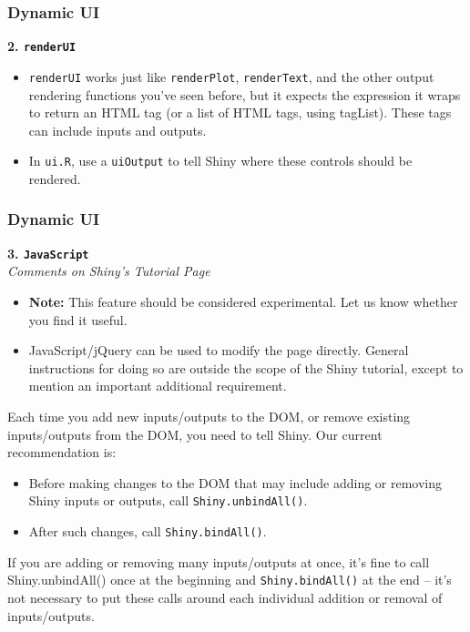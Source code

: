 \documentclass{beamer}
\begin{document}
\begin{frame}
\frametitle{Dynamic UI}
\Large
\textbf{2. \texttt{renderUI}}

\begin{itemize}
\item \texttt{renderUI} works just like \texttt{renderPlot}, \texttt{renderText}, and the other output rendering functions you’ve seen before, but it expects the expression it wraps to return an HTML tag (or a list of HTML tags, using tagList). These tags can include inputs and outputs.

\item In \texttt{ui.R}, use a \texttt{uiOutput} to tell Shiny where these controls should be rendered.
\end{itemize}
\end{frame}
\begin{frame}

\frametitle{Dynamic UI}
\Large
\textbf{3. \texttt{JavaScript}}\\

\textit{Comments on Shiny's Tutorial Page}
\begin{itemize}
\item \textbf{Note:} This feature should be considered experimental. Let us know whether you find it useful.

\item JavaScript/jQuery can be used to modify the page directly. General instructions for doing so are outside the scope of the Shiny tutorial, except to mention an important additional requirement. 
\end{itemize}
\end{frame}
\begin{frame}
Each time you add new inputs/outputs to the DOM, or remove existing inputs/outputs from the DOM, you need to tell Shiny. Our current recommendation is:
\begin{itemize}
\item Before making changes to the DOM that may include adding or removing Shiny inputs or outputs, call \texttt{Shiny.unbindAll()}.
\item After such changes, call \texttt{Shiny.bindAll()}.
\end{itemize}If you are adding or removing many inputs/outputs at once, it’s fine to call Shiny.unbindAll() once at the beginning and \texttt{Shiny.bindAll()} at the end – it’s not necessary to put these calls around each individual addition or removal of inputs/outputs.
\end{frame}
\end{document}
